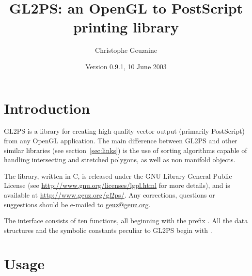 \documentclass[10pt]{article}
\newcommand{\dd}{\begingroup\Url}
\newcommand{\email}[2]{\href{mailto:#2}{#1}}
\begin{document}
\title{GL2PS: an OpenGL to PostScript printing library}
\author{Christophe Geuzaine}
\date{Version 0.9.1, 10 June 2003}

\maketitle


\tableofcontents

\section{Introduction}

GL2PS is a library for creating high quality vector output (primarily
PostScript) from any OpenGL application. The main difference between GL2PS
and other similar libraries (see section~\ref{sec:links}) is the use of
sorting algorithms capable of handling intersecting and stretched polygons,
as well as non manifold objects.

The library, written in C, is released under the GNU Library General Public
License (see \url{http://www.gnu.org/licenses/lgpl.html} for more details),
and is available at \url{http://www.geuz.org/gl2ps/}. Any corrections,
questions or suggestions should be e-mailed to
\email{geuz@geuz.org}{geuz@geuz.org}.

The interface consists of ten functions, all beginning with the prefix
\dd{gl2ps}. All the data structures and the symbolic constants peculiar to
GL2PS begin with \dd{GL2PS}.

\section{Usage}

\end{document}
